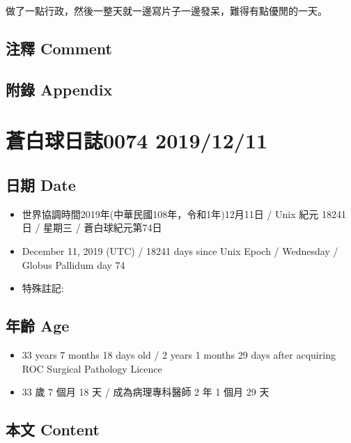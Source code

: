 \documentclass[
]{article}
\providecommand{\tightlist}{%
  \setlength{\itemsep}{0pt}\setlength{\parskip}{0pt}}
\begin{document}
做了一點行政，然後一整天就一邊寫片子一邊發呆，難得有點優閒的一天。

\hypertarget{ux6ce8ux91cb-comment-9}{%
\subsection{注釋 Comment}\label{ux6ce8ux91cb-comment-9}}

\hypertarget{ux9644ux9304-appendix-9}{%
\subsection{附錄 Appendix}\label{ux9644ux9304-appendix-9}}

\hypertarget{ux84bcux767dux7403ux65e5ux8a8c0074-20191211}{%
\section{蒼白球日誌0074
2019/12/11}\label{ux84bcux767dux7403ux65e5ux8a8c0074-20191211}}

\hypertarget{ux65e5ux671f-date-10}{%
\subsection{日期 Date}\label{ux65e5ux671f-date-10}}

\begin{itemize}
\tightlist
\item
  世界協調時間2019年(中華民國108年，令和1年)12月11日 / Unix 紀元 18241
  日 / 星期三 / 蒼白球紀元第74日
\item
  December 11, 2019 (UTC) / 18241 days since Unix Epoch / Wednesday /
  Globus Pallidum day 74
\item
  特殊註記:
\end{itemize}

\hypertarget{ux5e74ux9f61-age-10}{%
\subsection{年齡 Age}\label{ux5e74ux9f61-age-10}}

\begin{itemize}
\tightlist
\item
  33 years 7 months 18 days old / 2 years 1 months 29 days after
  acquiring ROC Surgical Pathology Licence
\item
  33 歲 7 個月 18 天 / 成為病理專科醫師 2 年 1 個月 29 天
\end{itemize}

\hypertarget{ux672cux6587-content-10}{%
\subsection{本文 Content}\label{ux672cux6587-content-10}}
\end{document}
